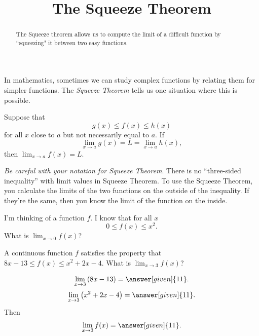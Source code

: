 \documentclass{ximera}
\title[Dig-In:]{The Squeeze Theorem}
\begin{document}
\begin{abstract}
The Squeeze theorem allows us to compute the limit of a difficult function by ``squeezing" it between two easy functions.
\end{abstract}
\maketitle

In mathematics, sometimes we can study complex functions by relating
them for simpler functions. The \textit{Squeeze Theorem} tells us one
situation where this is possible.

\begin{theorem}
  Suppose that
  \[
  g(x) \leq f(x) \leq h(x)
  \]
  for all $x$ close to $a$ but not necessarily equal to $a$. If
  \[
  \lim_{x\to a} g(x) = L = \lim_{x\to a} h(x),
  \]
  then $\lim_{x\to a} f(x) = L$.
\end{theorem}


\emph{Be careful with your notation for Squeeze Theorem}. There is no ``three-sided inequality'' with limit values in Squeeze Theorem. 
To use the Squeeze Theorem, you calculate the limits of the two functions on the outside of the inequality. If they're the same, then you know
the limit of the function on the inside. 

\begin{question}
  I'm thinking of a function $f$. I know that for all $x$
  \[
  0 \le f(x) \le x^2.
  \]
  What is $\lim_{x\to 0} f(x)$?
  \begin{prompt}
  \begin{multipleChoice}
  \end{multipleChoice}
  \end{prompt}
\end{question}

\begin{example}
A continuous function $f$ satisfies the property that $8x-13 \leq f(x) \leq x^2+2x-4$.
What is $\lim_{x\to 3} f(x)$?
	\begin{explanation}
		\[ \lim_{x\to 3} \left(8x-13\right) = \answer[given]{11}.\]		
		\[ \lim_{x\to 3} \left(x^2+2x-4\right) = \answer[given]{11}.\]
		Then \[\lim_{x\to 3} f(x) = \answer[given]{11}.\]
	\end{explanation}
\end{example}
\end{document}
